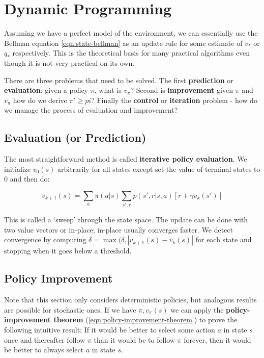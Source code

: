 \documentclass[11pt]{report}
\begin{document}
\chapter{Dynamic Programming}
Assuming we have a perfect model of the environment, we can essentially use the Bellman equation \autoref{eqn:state-bellman} as an update rule for some estimate of $v_*$ or $q_*$ respectively. This is the theoretical basis for many practical algorithms even though it is not very practical on its own.


There are three problems that need to be solved. The first \textbf{prediction} or \textbf{evaluation}: given a policy $\pi$, what is $v_\pi$? Second is \textbf{improvement} given $\pi$ and $v_\pi$ how do we derive $\pi' \ge pi$? Finally the \textbf{control} or \textbf{iteration} problem - how do we manage the process of evaluation and improvement?

\section{Evaluation (or Prediction)}
The most straightforward method is called \textbf{iterative policy evaluation}. We initialize $v_0(s)$ arbitrarily for all states except set the value of terminal states to 0 and then do:

\begin{equation}
	\label{eqn:iterative-policy-eval}
	v_{k+1}(s) = \sum_{a}\pi(a|s)\sum_{s',r}p(s',r|s,a)[r+\gamma v_k(s')]
\end{equation}

This is called a `sweep' through the state space. The update can be done with two value vectors or in-place; in-place usually converges faster. We detect convergence by computing $\delta = \max(\delta, |v_{k+1}(s) - v_k(s)|$ for each state and stopping when it goes below a threshold.


\section{Policy Improvement}
Note that this section only considers deterministic policies, but analogous results are possible for stochastic ones. If we have $\pi, v_\pi(s)$ we can apply the \textbf{policy-improvement theorem} (\autoref{eqn:policy-improvement-theorem}) to prove the following intuitive result: If it would be better to select some action $a$ in state $s$ once and thereafter follow $\pi$ than it would be to follow $\pi$ forever, then it would be better to always select $a$ in state $s$.
\end{document}
